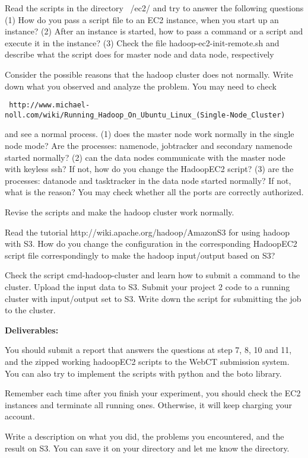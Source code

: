 \documentclass{article}
\begin{document}
Read the scripts in the directory ~/ec2/ and try to answer the
following questions\\

(1) How do you pass a script file to an EC2 instance, when you start
up an instance?  (2) After an instance is started, how to pass a
command or a script and execute it in the instance?  (3) Check the
file hadoop-ec2-init-remote.sh and describe what the script does for
master node and data node, respectively
 
Consider the possible reasons that the hadoop cluster does not
normally. Write down what you observed and analyze the problem. You
may need to check
\begin{verbatim}
 http://www.michael-noll.com/wiki/Running_Hadoop_On_Ubuntu_Linux_(Single-Node_Cluster)
\end{verbatim}
and see a normal process.  (1) does the master node work normally in
the single node mode? Are the processes: namenode, jobtracker and
secondary namenode started normally?  (2) can the data nodes
communicate with the master node with keyless ssh? If not, how do you
change the HadoopEC2 script?  (3) are the processes: datanode and
tasktracker in the data node started normally? If not, what is the
reason? You may check whether all the ports are correctly authorized.
 
Revise the scripts and make the hadoop cluster work normally.
 
Read the tutorial http://wiki.apache.org/hadoop/AmazonS3 for using
hadoop with S3. How do you change the configuration in the
corresponding HadoopEC2 script file correspondingly to make the hadoop
input/output based on S3?
 
Check the script cmd-hadoop-cluster and learn how to submit a command
to the cluster. Upload the input data to S3. Submit your project 2
code to a running cluster with input/output set to S3. Write down the
script for submitting the job to the cluster.
 
\textbf{Deliverables:}

You should submit a report that answers the questions at
step 7, 8, 10 and 11, and the zipped working hadoopEC2 scripts to the
WebCT submission system.  You can also try to implement the scripts
with python and the boto library.
 
Remember each time after you finish your experiment, you should check
the EC2 instances and terminate all running ones. Otherwise, it will
keep charging your account.
 
Write a description on what you did, the problems you encountered, and
the result on S3. You can save it on your directory and let me know
the directory.
 
\end{document}
